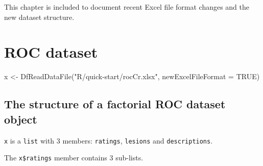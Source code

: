 \documentclass[
]{book}
\newenvironment{Shaded}{\begin{snugshade}}{\end{snugshade}}
\newcommand{\AttributeTok}[1]{\textcolor[rgb]{0.77,0.63,0.00}{#1}}
\newcommand{\CommentTok}[1]{\textcolor[rgb]{0.56,0.35,0.01}{\textit{#1}}}
\newcommand{\ConstantTok}[1]{\textcolor[rgb]{0.00,0.00,0.00}{#1}}
\newcommand{\DecValTok}[1]{\textcolor[rgb]{0.00,0.00,0.81}{#1}}
\newcommand{\FunctionTok}[1]{\textcolor[rgb]{0.00,0.00,0.00}{#1}}
\newcommand{\NormalTok}[1]{#1}
\newcommand{\OtherTok}[1]{\textcolor[rgb]{0.56,0.35,0.01}{#1}}
\newcommand{\SpecialCharTok}[1]{\textcolor[rgb]{0.00,0.00,0.00}{#1}}
\newcommand{\StringTok}[1]{\textcolor[rgb]{0.31,0.60,0.02}{#1}}
\begin{document}
This chapter is included to document recent Excel file format changes and the new dataset structure.

\hypertarget{dataset-object-details-roc-dataset}{%
\section{ROC dataset}\label{dataset-object-details-roc-dataset}}

\begin{Shaded}
\begin{Highlighting}[]
\NormalTok{x }\OtherTok{\textless{}{-}} \FunctionTok{DfReadDataFile}\NormalTok{(}\StringTok{"R/quick{-}start/rocCr.xlsx"}\NormalTok{, }\AttributeTok{newExcelFileFormat =} \ConstantTok{TRUE}\NormalTok{)}
\end{Highlighting}
\end{Shaded}

\hypertarget{dataset-object-details-structure-roc-dataset}{%
\subsection{The structure of a factorial ROC dataset object}\label{dataset-object-details-structure-roc-dataset}}

\texttt{x} is a \texttt{list} with 3 members: \texttt{ratings}, \texttt{lesions} and \texttt{descriptions}.

\begin{Shaded}
\end{Shaded}

The \texttt{x\$ratings} member contains 3 sub-lists.

\begin{Shaded}
\end{Shaded}
\end{document}
